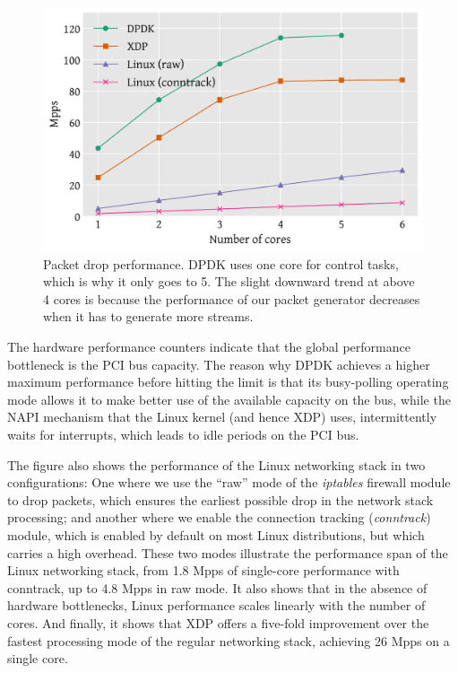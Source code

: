 \documentclass[10pt,sigconf]{acmart}
\begin{document}
\begin{figure}[t]
\centering
\includegraphics[width=\linewidth]{figures/drop-test.pdf}
\caption{\label{fig:drop-test} Packet drop performance. DPDK uses one core for
  control tasks, which is why it only goes to 5. The slight downward trend at
  above 4 cores is because the performance of our packet generator decreases
  when it has to generate more streams.}
\end{figure}


The hardware performance counters indicate that the global performance
bottleneck is the PCI bus capacity. The reason why DPDK achieves a higher
maximum performance before hitting the limit is that its busy-polling operating
mode allows it to make better use of the available capacity on the bus, while
the NAPI mechanism that the Linux kernel (and hence XDP) uses, intermittently
waits for interrupts, which leads to idle periods on the PCI bus.

The figure also shows the performance of the Linux networking stack in two
configurations: One where we use the ``raw'' mode of the \emph{iptables}
firewall module to drop packets, which ensures the earliest possible drop in the
network stack processing; and another where we enable the connection tracking
(\emph{conntrack}) module, which is enabled by default on most Linux
distributions, but which carries a high overhead. These two modes illustrate the
performance span of the Linux networking stack, from 1.8 Mpps of single-core
performance with conntrack, up to 4.8 Mpps in raw mode. It also shows that in
the absence of hardware bottlenecks, Linux performance scales linearly with the
number of cores. And finally, it shows that XDP offers a five-fold improvement
over the fastest processing mode of the regular networking stack, achieving 26
Mpps on a single core.
\end{document}
